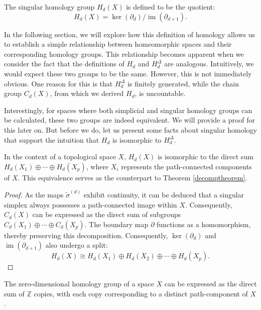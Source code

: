 \begin{definition}
	The singular homology group $H_{d}(X)$ is
	defined to be the quotient:
	\[
		H_{d}(X) = \ker(\partial_{d}) / \operatorname{im}(\partial_{d+1}).
	\]
\end{definition}

In the following section, we will explore how this definition of homology allows
us to establish a simple relationship between homeomorphic spaces and their corresponding
homology groups. This relationship becomes apparent when we consider the fact
that the definitions of $H_{d}$ and $H^{\Delta}_{d}$ are analogous. Intuitively,
we would expect these two groups to be the same. However, this is not
immediately obvious. One reason for this is that $H^{\Delta}_{d}$ is finitely generated,
while the chain group $C_{d}(X)$, from which we derived $H_{d}$, is uncountable.

Interestingly, for spaces where both simplicial and singular homology groups can
be calculated, these two groups are indeed equivalent. We will provide a proof for
this later on. But before we do, let us present some facts about singular homology
that support the intuition that $H_{d}$ is isomorphic to $H^{\Delta}_{d}$.

\begin{proposition}
	In the context of a topological space $X$, $H_{d}(X)$ is isomorphic to the
	direct sum $H_{d}(X_{1}) \oplus \cdots \oplus H_{d}(X_{p})$, where $X_{i}$ represents
	the path-connected components of $X$. This equivalence serves as the
	counterpart to Theorem \ref{decomptheorem}.
\end{proposition}

\begin{proof}
	As the maps $\tilde{\sigma}^{(d)}$ exhibit continuity, it can be deduced that
	a singular simplex always possesses a path-connected image within $X$. Consequently,
	$C_{d}(X)$ can be expressed as the direct sum of subgroups
	$C_{d}(X_{1}) \oplus \cdots \oplus C_{d}(X_{p})$. The boundary map $\partial$ functions
	as a homomorphism, thereby preserving this decomposition. Consequently,
	$\ker(\partial_{d})$ and $\operatorname{im}(\partial_{d+1})$ also undergo a
	split:
	\[
		H_{d}(X) \cong H_{d}(X_{1}) \oplus H_{d}(X_{2}) \oplus \cdots \oplus H_{d}(X_{p}
		).
	\]
\end{proof}

\begin{proposition}
	The zero-dimensional homology group of a space $X$ can be expressed as the direct
	sum of $\mathbb{Z}$ copies, with each copy corresponding to a distinct path-component
	of $X$.
\end{proposition}

